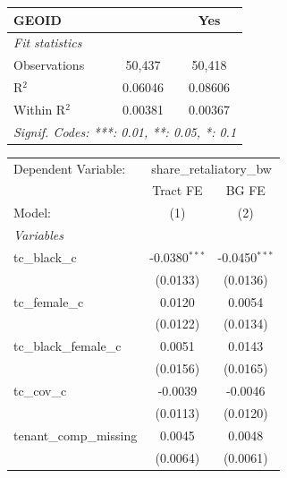\begin{tabular}{lcc}
   GEOID                                                 &                 & Yes\\  
   \midrule
   \emph{Fit statistics}\\
   Observations                                          & 50,437          & 50,418\\  
   R$^2$                                                 & 0.06046         & 0.08606\\  
   Within R$^2$                                          & 0.00381         & 0.00367\\  
   \midrule \midrule
   \multicolumn{3}{l}{\emph{Signif. Codes: ***: 0.01, **: 0.05, *: 0.1}}\\
\end{tabular}
\par\endgroup
\begingroup
\centering
\begin{tabular}{lcc}
   \tabularnewline \midrule \midrule
   Dependent Variable: & \multicolumn{2}{c}{share\_retaliatory\_bw}\\
                                                         & Tract FE        & BG FE \\   
   Model:                                                & (1)             & (2)\\  
   \midrule
   \emph{Variables}\\
   tc\_black\_c                                          & -0.0380$^{***}$ & -0.0450$^{***}$\\   
                                                         & (0.0133)        & (0.0136)\\   
   tc\_female\_c                                         & 0.0120          & 0.0054\\   
                                                         & (0.0122)        & (0.0134)\\   
   tc\_black\_female\_c                                  & 0.0051          & 0.0143\\   
                                                         & (0.0156)        & (0.0165)\\   
   tc\_cov\_c                                            & -0.0039         & -0.0046\\   
                                                         & (0.0113)        & (0.0120)\\   
   tenant\_comp\_missing                                 & 0.0045          & 0.0048\\   
                                                         & (0.0064)        & (0.0061)\\   

\end{tabular}
